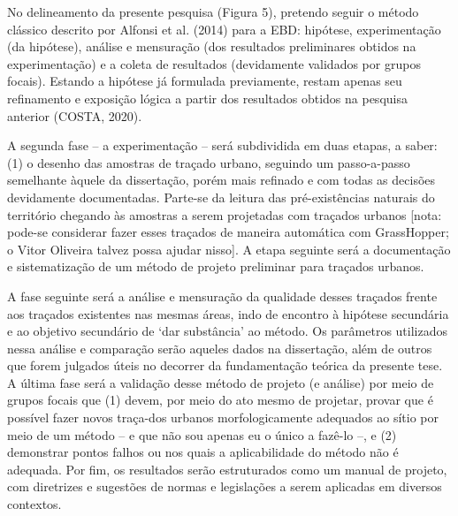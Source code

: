 \documentclass[twoside, 12pt]{book}
\begin{document}
\begin{enumerate}[label=\alph*)]
        No delineamento da presente pesquisa (Figura 5), pretendo seguir o método clássico descrito por Alfonsi et al. (2014) para a EBD: hipótese, experimentação (da hipótese), análise e mensuração (dos resultados preliminares obtidos na experimentação) e a coleta de resultados (devidamente validados por grupos focais). Estando a hipótese já formulada previamente, restam apenas seu refinamento e exposição lógica a partir dos resultados obtidos na pesquisa anterior (COSTA, 2020).

        A segunda fase – a experimentação – será subdividida em duas etapas, a saber: (1) o desenho das amostras de traçado urbano, seguindo um passo-a-passo semelhante àquele da dissertação, porém mais refinado e com todas as decisões devidamente documentadas. Parte-se da leitura das pré-existências naturais do território chegando às amostras a serem projetadas com traçados urbanos [nota: pode-se considerar fazer esses traçados de maneira automática com GrassHopper; o Vitor Oliveira talvez possa ajudar nisso]. A etapa seguinte será a documentação e sistematização de um método de projeto preliminar para traçados urbanos. 

        A fase seguinte será a análise e mensuração da qualidade desses traçados frente aos traçados existentes nas mesmas áreas, indo de encontro à hipótese secundária e ao objetivo secundário de ‘dar substância’ ao método. Os parâmetros utilizados nessa análise e comparação serão aqueles dados na dissertação, além de outros que forem julgados úteis no decorrer da fundamentação teórica da presente tese. A última fase será a validação desse método de projeto (e análise) por meio de grupos focais que (1) devem, por meio do ato mesmo de projetar, provar que é possível fazer novos traça-dos urbanos morfologicamente adequados ao sítio por meio de um método – e que não sou apenas eu o único a fazê-lo –, e (2) demonstrar pontos falhos ou nos quais a aplicabilidade do método não é adequada. Por fim, os resultados serão estruturados como um manual de projeto, com diretrizes e sugestões de normas e legislações a serem aplicadas em diversos contextos.


\end{enumerate}
\end{document}
